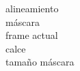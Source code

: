 \documentclass[14pt,letterpaper,hidelinks]{extarticle}
\begin{document}
alineamiento\\

máscara\\

frame actual\\

calce\\

tamaño máscara\\
%
%
%

%


\end{document}
